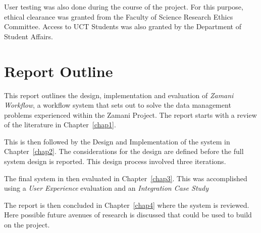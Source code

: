     User testing was also done during the course of the project. For
    this purpose, ethical clearance was granted from the Faculty of
    Science Research Ethics Committee. Access to UCT Students was also
    granted by the Department of Student Affairs.

\section{Report Outline}
    This report outlines the design, implementation and evaluation
    of \emph{Zamani Workflow}, a workflow system that sets out to
    solve the data management problems experienced within the
    Zamani Project. The report starts with a review of the literature in
    Chapter~\ref{chap1}.

    This is then followed by the Design and Implementation of the system
    in Chapter~\ref{chap2}. The considerations for the design are defined
    before the full system design is reported. This design process involved
    three iterations.

    The final system in then evaluated in Chapter~\ref{chap3}. This was accomplished
    using a \emph{User Experience} evaluation and an \emph{Integration Case Study}

    The report is then concluded in Chapter~\ref{chap4} where the system is
    reviewed. Here possible future avenues of research is discussed that could
    be used to build on the project.

